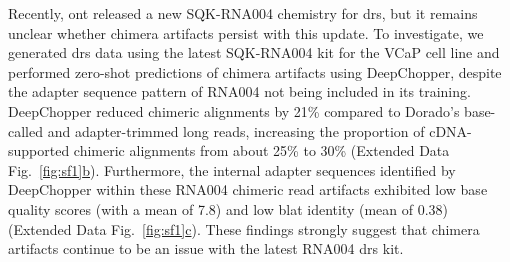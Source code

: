 \documentclass[pdflatex,sn-nature, lineno]{sn-jnl}%
\newcommand{\edfigref}[2]{Extended Data Fig.~\hyperref[#1]{\ref*{#1}#2}}
\begin{document}
Recently, \gls{ont} released a new SQK-RNA004 chemistry for \gls{drs}, but it remains unclear whether chimera artifacts persist with this update.
To investigate, we generated \gls{drs} data using the latest SQK-RNA004 kit for the VCaP cell line and performed zero-shot predictions of chimera artifacts using DeepChopper, despite the adapter sequence pattern of RNA004 not being included in its training.
DeepChopper reduced chimeric alignments by 21\% compared to Dorado's base-called and adapter-trimmed long reads, increasing the proportion of cDNA-supported chimeric alignments from about 25\% to 30\% (\edfigref{fig:sf1}{b}).
Furthermore, the internal adapter sequences identified by DeepChopper within these RNA004 chimeric read artifacts exhibited low base quality scores (with a mean of 7.8) and low \gls{blat} identity (mean of 0.38) (\edfigref{fig:sf1}{c}).
These findings strongly suggest that chimera artifacts continue to be an issue with the latest RNA004 \gls{drs} kit.
\end{document}
